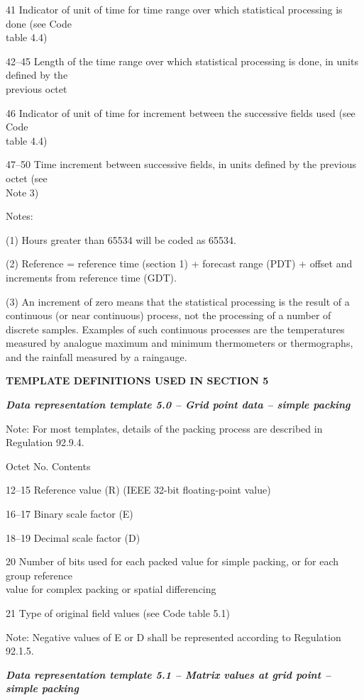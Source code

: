 41 Indicator of unit of time for time range over which statistical processing is done (see Code\\
table 4.4)

42--45 Length of the time range over which statistical processing is done, in units defined by the\\
previous octet

46 Indicator of unit of time for increment between the successive fields used (see Code\\
table 4.4)

47--50 Time increment between successive fields, in units defined by the previous octet (see\\
Note 3)

Notes:

(1) Hours greater than 65534 will be coded as 65534.

(2) Reference = reference time (section 1) + forecast range (PDT) + offset and increments from reference time (GDT).

(3) An increment of zero means that the statistical processing is the result of a continuous (or near continuous) process, not the processing of a number of discrete samples. Examples of such continuous processes are the temperatures measured by analogue maximum and minimum thermometers or thermographs, and the rainfall measured by a raingauge.

\textbf{TEMPLATE DEFINITIONS USED IN SECTION 5}

\emph{\textbf{Data representation template 5.0 -- Grid point data -- simple packing}}

Note: For most templates, details of the packing process are described in Regulation 92.9.4.

Octet No. Contents

12--15 Reference value (R) (IEEE 32-bit floating-point value)

16--17 Binary scale factor (E)

18--19 Decimal scale factor (D)

20 Number of bits used for each packed value for simple packing, or for each group reference\\
value for complex packing or spatial differencing

21 Type of original field values (see Code table 5.1)

Note: Negative values of E or D shall be represented according to Regulation 92.1.5.

\emph{\textbf{Data representation template 5.1 -- Matrix values at grid point -- simple packing}}

